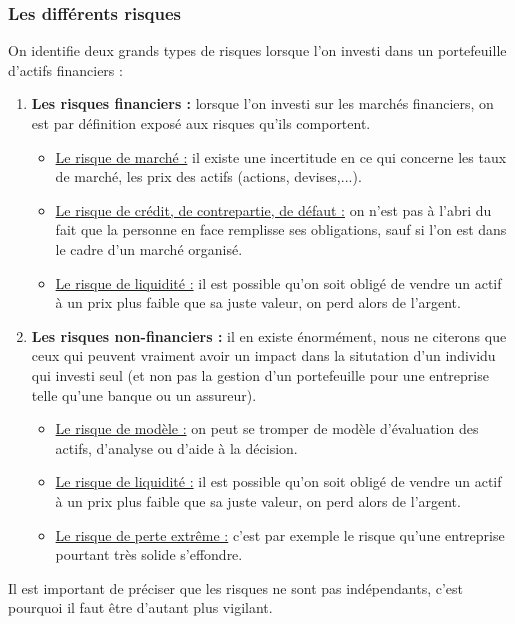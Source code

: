 \subsubsection{Les différents risques}
On identifie deux grands types de risques lorsque l'on investi dans un portefeuille d'actifs financiers :
\begin{enumerate}
 \item \textbf{Les risques financiers :} lorsque l'on investi sur les marchés financiers, on est par définition exposé aux risques qu'ils comportent.
    \begin{itemize}
     \item \underline{Le risque de marché :} il existe une incertitude en ce qui concerne les taux de marché, les prix des actifs (actions, devises,...).
     \item \underline{Le risque de crédit, de contrepartie, de défaut :} on n'est pas à l'abri du fait que la personne en face remplisse ses obligations, sauf si l'on est dans le cadre d'un marché organisé.
     \item \underline{Le risque de liquidité :} il est possible qu'on soit obligé de vendre un actif à un prix plus faible que sa juste valeur, on perd alors de l'argent.
    \end{itemize}
 \item \textbf{Les risques non-financiers :} il en existe énormément, nous ne citerons que ceux qui peuvent vraiment avoir un impact dans la situtation d'un individu qui investi seul (et non pas la gestion d'un portefeuille pour une entreprise telle qu'une banque ou un assureur).
    \begin{itemize}
     \item \underline{Le risque de modèle :} on peut se tromper de modèle d'évaluation des actifs, d'analyse ou d'aide à la décision.
     \item \underline{Le risque de liquidité :} il est possible qu'on soit obligé de vendre un actif à un prix plus faible que sa juste valeur, on perd alors de l'argent.
     \item \underline{Le risque de perte extrême :} c'est par exemple le risque qu'une entreprise pourtant très solide s'effondre.
    \end{itemize}
\end{enumerate}
Il est important de préciser que les risques ne sont pas indépendants, c'est pourquoi il faut être d'autant plus vigilant.

